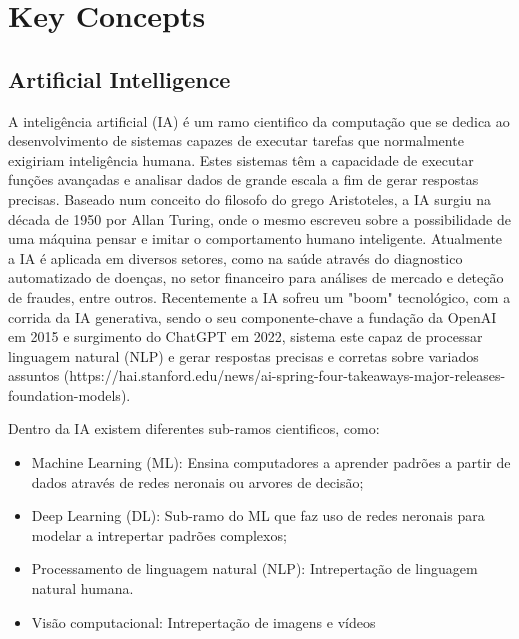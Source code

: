 
\chapter{Key Concepts} %



\section{Artificial Intelligence}

A inteligência artificial (IA) é um ramo cientifico da computação que se dedica ao desenvolvimento de sistemas capazes de executar tarefas que normalmente exigiriam inteligência humana.
Estes sistemas têm a capacidade de executar funções avançadas e analisar dados de grande escala a fim de gerar respostas precisas.  Baseado num conceito do filosofo do grego Aristoteles, a IA surgiu na década de 1950 por Allan Turing, onde o mesmo escreveu sobre a possibilidade de uma máquina pensar e imitar o comportamento humano inteligente. 
Atualmente a IA é aplicada em diversos setores, como na saúde através do diagnostico automatizado de doenças, no setor financeiro para análises de mercado e deteção de fraudes, entre outros. Recentemente a IA sofreu um "boom" tecnológico, com a corrida da IA generativa, sendo o seu componente-chave a fundação da OpenAI em 2015 e surgimento do ChatGPT em 2022, sistema este capaz de processar linguagem natural (NLP) e gerar respostas precisas e corretas sobre variados assuntos (https://hai.stanford.edu/news/ai-spring-four-takeaways-major-releases-foundation-models).

Dentro da IA existem diferentes sub-ramos cientificos, como:

\begin{itemize}
    \item Machine Learning (ML): Ensina computadores a aprender padrões a partir de dados através de redes neronais ou arvores de decisão;
    \item Deep Learning (DL): Sub-ramo do ML que faz uso de redes neronais para modelar a intrepertar padrões complexos;
    \item Processamento de linguagem natural (NLP): Intrepertação de linguagem natural humana.
    \item Visão computacional: Intrepertação de imagens e vídeos
\end{itemize}




